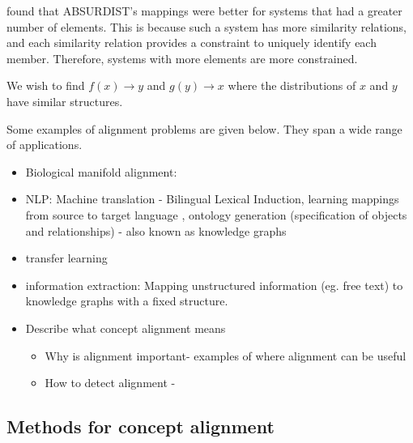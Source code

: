 \cite{GOLDSTONE2002295} found that ABSURDIST's mappings were better for systems that had a greater number of elements. This is because such a system has more similarity relations, and each similarity relation provides a constraint to uniquely identify each member. Therefore, systems with more elements are more constrained. 

We wish to find $f(x) \rightarrow y$ and $g(y) \rightarrow x$ where the distributions of $x$ and $y$  have similar structures. 

Some examples of alignment problems are given below. They span a wide range of applications. 

\begin{itemize}
    \item Biological manifold alignment: \cite{magan}
    \item NLP: Machine translation - Bilingual Lexical Induction, learning mappings from source to target language \cite{kalinowski2020survey}, ontology generation (specification of objects and relationships) - also known as knowledge graphs
    \item transfer learning
    \item information extraction: Mapping unstructured information (eg. free text) to knowledge graphs with a fixed structure. 
\end{itemize}

\begin{itemize}
    \item Describe what concept alignment means
    \begin{itemize}
        \item Why is alignment important- examples of where alignment can be useful 

        \item How to detect alignment - \cite{RepresentationalSimilarityAnalysis}
    \end{itemize}
\end{itemize}

\subsection{Methods for concept alignment}

